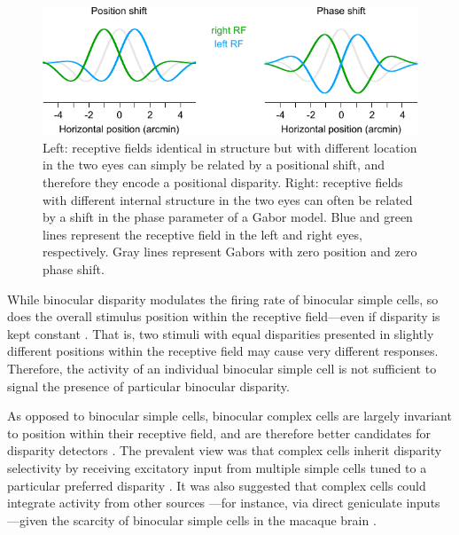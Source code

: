 \begin{figure}
  \centering
  \includegraphics{position-phase}
  \caption[Receptive fields with interocular position and phase shifts.]{Left: receptive fields identical in structure but with different location in the two eyes can simply be related by a positional shift, and therefore they encode a positional disparity. Right: receptive fields with different internal structure in the two eyes can often be related by a shift in the phase parameter of a Gabor model. Blue and green lines represent the receptive field in the left and right eyes, respectively. Gray lines represent Gabors with zero position and zero phase shift.}
  \label{fig:posphase}
\end{figure}

While binocular disparity modulates the firing rate of binocular simple cells, so does the overall stimulus position within the receptive field---even if disparity is kept constant \cite{Ohzawa:1990cq,Anzai:1997ud,Anzai:1999xd}. That is, two stimuli with equal disparities presented in slightly different positions within the receptive field may cause very different responses. Therefore, the activity of an individual binocular simple cell is not sufficient to signal the presence of particular binocular disparity.

As opposed to binocular simple cells, binocular complex cells are largely invariant to position within their receptive field, and are therefore better candidates for disparity detectors \cite{Ohzawa:1990cq}. The prevalent view was that complex cells inherit disparity selectivity by receiving excitatory input from multiple simple cells tuned to a particular preferred disparity \cite{Ohzawa:1986xy,Ohzawa:1990cq,Ohzawa:1997bd,Anzai1999}. It was also suggested that complex cells could integrate activity from other sources \cite{Livingstone:1999mp}---for instance, via direct geniculate inputs \cite{Archie:2000fk}---given the scarcity of binocular simple cells in the macaque brain \cite{Hubel:1968hz}.

